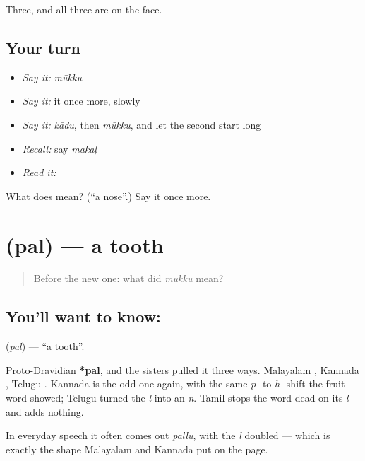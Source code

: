 \begin{grammarlens}[title={What you've built}]
Three, and all three are on the face.
\end{grammarlens}

\subsection*{Your turn}
\begin{itemize}
\raggedright
  \item \emph{Say it:} \emph{mūkku}
  \item \emph{Say it:} it once more, slowly
  \item \emph{Say it:} \emph{kādu}, then \emph{mūkku}, and let the second start long
  \item \emph{Recall:} say \emph{makaḷ}
  \item \emph{Read it:} \textbf{}
\end{itemize}

\begin{tcolorbox}[breakable,colback=teal!4,colframe=teal!35!black,title={Before you move on}]
What does  mean? (\textquotedblleft{}a nose\textquotedblright{}.) Say it once more.
\end{tcolorbox}
\section[\texorpdfstring{\ta{பல்} (pal)}{பல் (pal)}]{ (pal) — a tooth}

\label{lesson:TA-C45-tooth}



\begin{quote}
Before the new one: what did \emph{mūkku} mean?
\end{quote}

\subsection*{You'll want to know: }
\textbf{} (\emph{pal}) — \textquotedblleft{}a tooth\textquotedblright{}.

Proto-Dravidian \textbf{*pal}, and the sisters pulled it three ways. Malayalam , Kannada , Telugu . Kannada is the odd one again, with the same \emph{p-} to \emph{h-} shift the fruit-word showed; Telugu turned the \emph{l} into an \emph{n}. Tamil stops the word dead on its \emph{l} and adds nothing.

In everyday speech it often comes out \emph{pallu}, with the \emph{l} doubled — which is exactly the shape Malayalam and Kannada put on the page.

